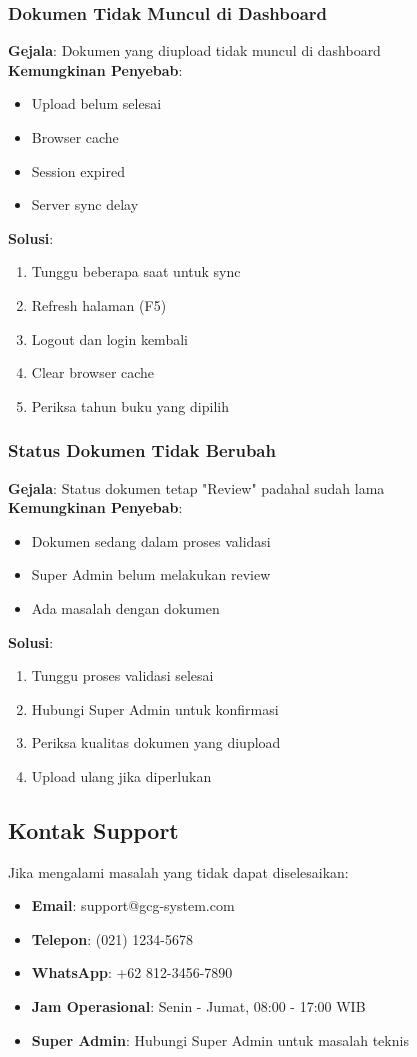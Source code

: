 \documentclass[12pt,a4paper]{article}
\begin{document}
\subsubsection{Dokumen Tidak Muncul di Dashboard}
\textbf{Gejala}: Dokumen yang diupload tidak muncul di dashboard\\
\textbf{Kemungkinan Penyebab}:
\begin{itemize}
\item Upload belum selesai
\item Browser cache
\item Session expired
\item Server sync delay
\end{itemize}
\textbf{Solusi}:
\begin{enumerate}
\item Tunggu beberapa saat untuk sync
\item Refresh halaman (F5)
\item Logout dan login kembali
\item Clear browser cache
\item Periksa tahun buku yang dipilih
\end{enumerate}

\subsubsection{Status Dokumen Tidak Berubah}
\textbf{Gejala}: Status dokumen tetap "Review" padahal sudah lama\\
\textbf{Kemungkinan Penyebab}:
\begin{itemize}
\item Dokumen sedang dalam proses validasi
\item Super Admin belum melakukan review
\item Ada masalah dengan dokumen
\end{itemize}
\textbf{Solusi}:
\begin{enumerate}
\item Tunggu proses validasi selesai
\item Hubungi Super Admin untuk konfirmasi
\item Periksa kualitas dokumen yang diupload
\item Upload ulang jika diperlukan
\end{enumerate}

\subsection{Kontak Support}
Jika mengalami masalah yang tidak dapat diselesaikan:
\begin{itemize}
\item \textbf{Email}: support@gcg-system.com
\item \textbf{Telepon}: (021) 1234-5678
\item \textbf{WhatsApp}: +62 812-3456-7890
\item \textbf{Jam Operasional}: Senin - Jumat, 08:00 - 17:00 WIB
\item \textbf{Super Admin}: Hubungi Super Admin untuk masalah teknis
\end{itemize}
\end{document}

